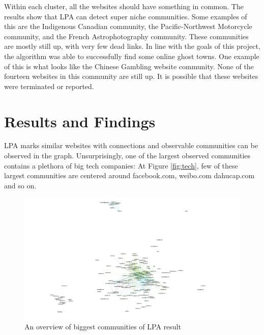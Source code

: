 \documentclass[conference]{IEEEtran}
\begin{document}
Within each cluster, all the websites should have something in common. The results show that LPA can detect super niche communities. Some examples of this are the Indigenous Canadian community, the Pacific-Northwest Motorcycle community, and the French Astrophotography community. These communities are mostly still up, with very few dead links. In line with the goals of this project, the algorithm was able to successfully find some online ghost towns. One example of this is what looks like the Chinese Gambling website community. None of the fourteen websites in this community are still up. It is possible that these websites were terminated or reported.

\section{Results and Findings}
LPA marks similar websites with connections and observable communities can be observed in the graph. Unsurprisingly, one of the largest observed communities contains a plethora of big tech companies: At Figure \ref{fig:tech}, few of these largest communities are centered around facebook.com, weibo.com dahucap.com and so on.

\begin{figure}[htbp]
 \centerline{\includegraphics[width=\columnwidth]{figs/Huge.png}}
 \caption{An overview of biggest communities of LPA result}
\end{figure}
\end{document}
